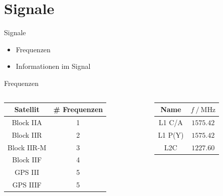 \section{Signale}
\label{sec:signale}

\begin{frame}{Signale}
    \begin{itemize}
        \item Frequenzen
        \item Informationen im Signal
    \end{itemize}
\end{frame}

\begin{frame}{Frequenzen}
    \begin{columns}
        \begin{column}{0.5\textwidth}
            \begin{table}
                \centering
                \begin{tabular}{c S[table-format=1.0]}
                    \toprule
                    {Satellit} & {\# Frequenzen} \\
                    \midrule
                    Block IIA   & 1 \\
                    Block IIR   & 2 \\
                    Block IIR-M & 3 \\
                    Block IIF   & 4 \\
                    GPS III     & 5 \\
                    GPS IIIF    & 5 \\
                    \bottomrule
                \end{tabular}
            \end{table}
        \end{column}
        \begin{column}{0.5\textwidth}
            \begin{table}
                \centering
                \begin{tabular}{c c}
                    \toprule
                    {Name} & {$f\:/\:\si{\mega\hertz}$} \\
                    \midrule
                    L1 C/A  & $\num{1575.42}$ \\
                    L1 P(Y) & $\num{1575.42}$ \\
                    L2C     & $\num{1227.60}$ \\

\end{tabular}
\end{table}
\end{column}
\end{columns}
\end{frame}
